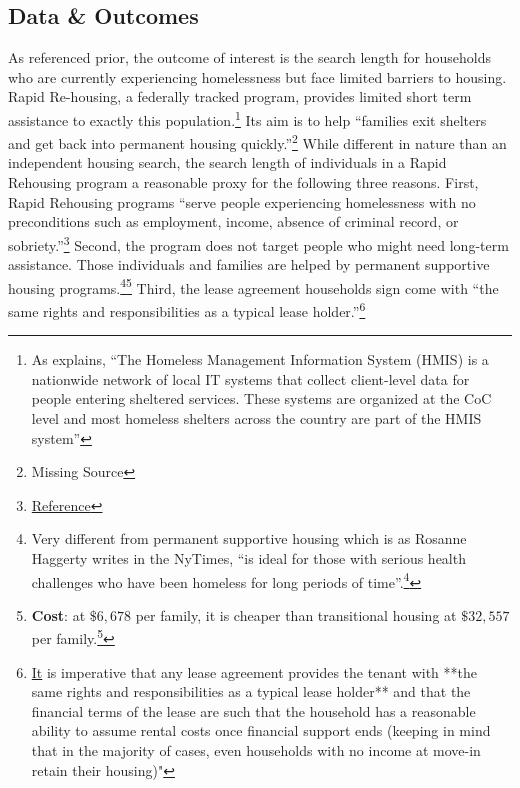 \documentclass[a4paper,12pt]{article}
\begin{document}
\subsection{Data \& Outcomes}
As referenced prior, the outcome of interest is the search length for households who are currently experiencing homelessness but face limited barriers to housing. Rapid Re-housing, a federally tracked program, provides limited short term assistance to exactly this population.\footnote{As \cite{evans2019reducing} explains, ``The
Homeless Management Information System (HMIS) is a nationwide network of local IT systems that collect
client-level data for people entering sheltered services. These systems are organized at the CoC level and most
homeless shelters across the country are part of the HMIS system''} Its aim is to help ``families exit shelters and get back into permanent housing quickly.''\footnote{\textrm{Missing Source}} While different in nature than an independent housing search, the search length of individuals in a Rapid Rehousing program a reasonable proxy for the following three reasons. First, Rapid Rehousing programs ``serve people experiencing homelessness with no preconditions such as employment, income, absence of criminal record, or sobriety.''\footnote{\href{https://www.urban.org/sites/default/files/publication/99153/rapid_re-housings_role_in_responding_to_homelessness_3.pdf}{Reference}} Second, the program does not target people who might need long-term assistance. Those individuals and families are helped by permanent supportive housing programs.\footnote{Very different from permanent supportive housing which is as Rosanne Haggerty writes in the NyTimes, ``is ideal for those with serious health challenges who have been homeless for long periods of time''.\footnote{\href{https://www.nytimes.com/roomfordebate/2015/02/19/homes-for-the-homeless/for-even-the-neediest-housing-is-the-solution-to-homelessness}{NyTimes}}}\footnote{ \textbf{Cost}: at $\$6,678$ per family, it is cheaper than transitional housing at $\$32,557$ per family.\footnote{\href{https://cceh.org/provider-resources/rapid-rehousing/}{CCEH Video}}} Third, the lease agreement households sign come with ``the same rights and responsibilities as a typical lease holder.''\footnote{\href{thttps://endhomelessness.org/resource/rapid-re-housing-a-history-and-core-components/}{It} is imperative that any lease agreement provides the tenant with **the same rights and responsibilities as a typical lease holder** and that the financial terms of the lease are such that the household has a reasonable ability to assume rental costs once financial support ends (keeping in mind that in the majority of cases, even households with no income at move-in retain their housing)"}
\end{document}
